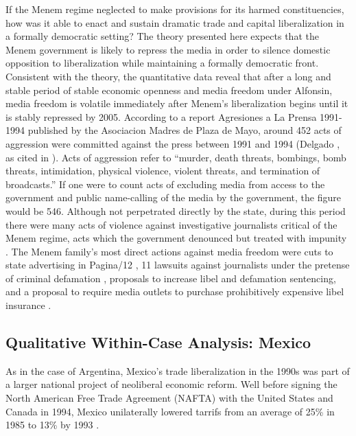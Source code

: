 \documentclass[12pt,a4paper]{article}\usepackage[]{graphicx}\usepackage[]{color}
\begin{document}
If the Menem regime neglected to make provisions for its harmed constituencies, how was it able to enact and sustain dramatic trade and capital liberalization in a formally democratic setting? The theory presented here expects that the Menem government is likely to repress the media in order to silence domestic opposition to liberalization while maintaining a formally democratic front. Consistent with the theory, the quantitative data reveal that after a long and stable period of stable economic openness and media freedom under Alfonsin, media freedom is volatile immediately after Menem's liberalization begins until it is stably repressed by 2005. According to a report Agresiones a La Prensa 1991-1994 published by the Asociacion Madres de Plaza de Mayo, around 452 acts of aggression were committed against the press between 1991 and 1994 (Delgado \cite*{Delgado:1995tr}, as cited in \cite[247]{Park:2002io}). Acts of aggression refer to “murder, death threats, bombings, bomb threats, intimidation, physical violence, violent threats, and termination of broadcasts.” If one were to count acts of excluding media from access to the government and public name-calling of the media by the government, the figure would be 546. Although not perpetrated directly by the state, during this period there were many acts of violence against investigative journalists critical of the Menem regime, acts which the government denounced but treated with impunity \parencite{Long:1993wb}. The Menem family's most direct actions against media freedom were cuts to state advertising in Pagina/12 \parencite[27]{Waisbord:1994kq}, 11 lawsuits against journalists under the pretense of criminal defamation \parencite{McCullough:1991cs}, proposals to increase libel and defamation sentencing, and a proposal to require media outlets to purchase prohibitively expensive libel insurance \parencite{Sims:kgMPqAHd}.

\subsection{Qualitative Within-Case Analysis: Mexico}

As in the case of Argentina, Mexico's trade liberalization in the 1990s was part of a larger national project of neoliberal economic reform. Well before signing the North American Free Trade Agreement (NAFTA) with the United States and Canada in 1994, Mexico unilaterally lowered tarrifs from an average of 25\% in 1985 to 13\% by 1993 \parencite{McDaniel:2003kw}.
\end{document}
